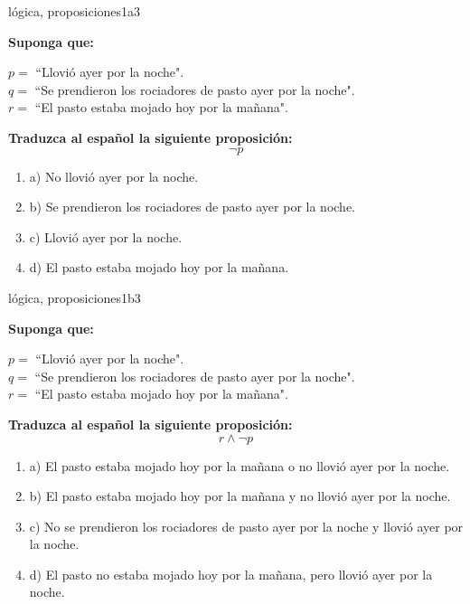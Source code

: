 \documentclass{article}
\begin{document}
\begin{question}{1}{lógica, proposiciones}{1}{a}{3}{
\textbf{Suponga que:} \medskip

\(p = \) ``Llovió ayer por la noche".\\
\(q = \) ``Se prendieron los rociadores de pasto ayer por la noche".\\
\(r = \) ``El pasto estaba mojado hoy por la mañana".\medskip

\textbf{Traduzca al español la siguiente proposición:}
\[
\neg p
\]

\begin{enumerate}
    \item a) No llovió ayer por la noche.
    \item b) Se prendieron los rociadores de pasto ayer por la noche.
    \item c) Llovió ayer por la noche.
    \item d) El pasto estaba mojado hoy por la mañana.
\end{enumerate}
}
\end{question}

\begin{question}{2}{lógica, proposiciones}{1}{b}{3}{
\textbf{Suponga que:} \medskip

\(p = \) ``Llovió ayer por la noche".\\
\(q = \) ``Se prendieron los rociadores de pasto ayer por la noche".\\
\(r = \) ``El pasto estaba mojado hoy por la mañana".\medskip

\textbf{Traduzca al español la siguiente proposición:}
\[
r \land \neg p
\]

\begin{enumerate}
    \item a) El pasto estaba mojado hoy por la mañana o no llovió ayer por la noche.
    \item b) El pasto estaba mojado hoy por la mañana y no llovió ayer por la noche.
    \item c) No se prendieron los rociadores de pasto ayer por la noche y llovió ayer por la noche.
    \item d) El pasto no estaba mojado hoy por la mañana, pero llovió ayer por la noche.
\end{enumerate}
}
\end{question}
\end{document}
